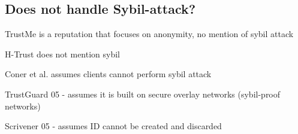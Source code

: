 % 
% 
% 
% 
% 


\subsection{Does not handle Sybil-attack?}
TrustMe\cite{singh2003trustme} is a reputation that focuses on anonymity, no mention of sybil attack

H-Trust\cite{zhao2009htrust} does not mention sybil

Coner et al.\cite{conner2009trust} assumes clients cannot perform sybil attack

TrustGuard 05\cite{srivatsa2005trustguard} - assumes it is built on secure overlay networks (sybil-proof networks)

Scrivener 05\cite{nandi2005scrivener} - assumes ID cannot be created and discarded

